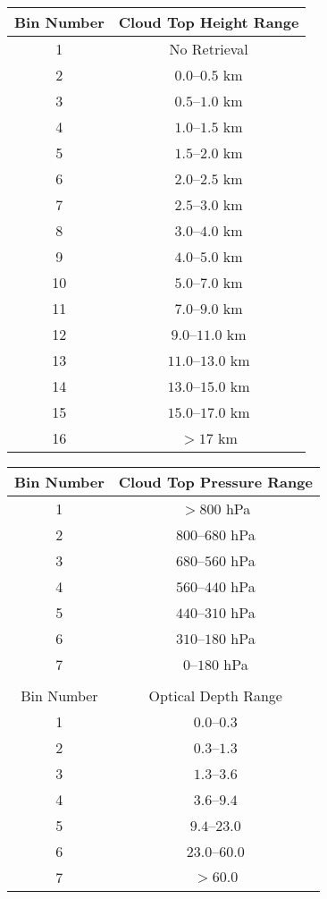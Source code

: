 \begin{tabular}{cc}
\hline
Bin Number  & Cloud Top Height Range \\ \hline
1           & No Retrieval \\
2           & $0.0$--$0.5$ km \\
3           & $0.5$--$1.0$ km \\
4           & $1.0$--$1.5$ km \\
5           & $1.5$--$2.0$ km \\
6           & $2.0$--$2.5$ km \\
7           & $2.5$--$3.0$ km \\
8           & $3.0$--$4.0$ km \\
9           & $4.0$--$5.0$ km \\
10          & $5.0$--$7.0$ km \\
11          & $7.0$--$9.0$ km \\
12          & $9.0$--$11.0$ km \\
13          & $11.0$--$13.0$ km \\
14          & $13.0$--$15.0$ km \\
15          & $15.0$--$17.0$ km \\
16          & $>17$ km \\ \hline
\end{tabular}
\begin{tabular}{cc}
\hline
Bin Number  & Cloud Top Pressure Range \\ \hline
1           & $>800$ hPa \\
2           & $800$--$680$ hPa \\
3           & $680$--$560$ hPa \\
4           & $560$--$440$ hPa \\
5           & $440$--$310$ hPa \\
6           & $310$--$180$ hPa \\
7           & $0$--$180$ hPa \\
            & \\ \hline
Bin Number  & Optical Depth Range \\ \hline
1           & $0.0$--$0.3$   \\
2           & $0.3$--$1.3$   \\
3           & $1.3$--$3.6$   \\
4           & $3.6$--$9.4$   \\
5           & $9.4$--$23.0$  \\
6           & $23.0$--$60.0$ \\
7           & $>60.0$     \\ \hline
\end{tabular}

